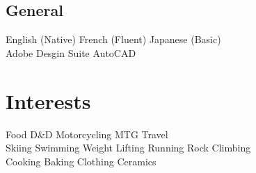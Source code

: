 \documentclass[]{willguthrie-resume}
\begin{document}
\begin{minipage}[t][][b]{0.33\textwidth}
	\subsection{General}
	English (Native) \tb French (Fluent) \tb Japanese (Basic) \\
	Adobe Desgin Suite \tb AutoCAD
	\sectionsep

	\section{Interests}
	Food \tb D\&D \tb Motorcycling \tb MTG \tb Travel \\
	Skiing \tb Swimming \tb Weight Lifting \tb Running \tb Rock Climbing \\
	Cooking \tb Baking \tb Clothing \tb Ceramics

\end{minipage}
\hfill
\end{document}
